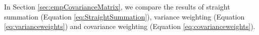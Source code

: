 \documentclass[]{aastex62}
\begin{document}
In Section \ref{sec:empCovarianceMatrix}, we compare the results of straight summation (Equation \ref{eq:StraightSummation}), variance weighting (Equation \ref{eq:varianceweights}) and covariance weighting (Equation \ref{eq:covarianceweights}).
%
\end{document}
